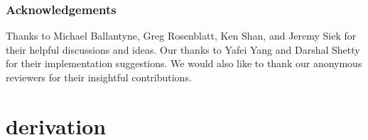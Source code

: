 \documentclass[runningheads,natbib=false]{llncs}
\begin{document}
\subsubsection{Acknowledgements}

Thanks to Michael Ballantyne, Greg Rosenblatt, Ken Shan, and Jeremy
Siek for their helpful discussions and ideas. Our thanks to Yafei
Yang and Darshal Shetty for their implementation suggestions. We
would also like to thank our anonymous reviewers for their
insightful contributions.

\printbibliography{}

\appendix

\section{ derivation}\label{sec:conda-derivation}

\end{document}
